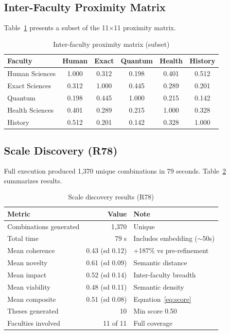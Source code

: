 \documentclass[a4paper,12pt]{article}
\begin{document}
\subsection{Inter-Faculty Proximity Matrix}

Table~\ref{tab:proximity} presents a subset of the 11$\times$11 proximity matrix.

\begin{table}[H]
\centering
\caption{Inter-faculty proximity matrix (subset)}
\label{tab:proximity}
\begin{tabular}{lccccc}
\toprule
\textbf{Faculty} & \textbf{Human} & \textbf{Exact} & \textbf{Quantum} & \textbf{Health} & \textbf{History} \\
\midrule
Human Sciences   & 1.000 & 0.312 & 0.198 & 0.401 & 0.512 \\
Exact Sciences   & 0.312 & 1.000 & 0.445 & 0.289 & 0.201 \\
Quantum          & 0.198 & 0.445 & 1.000 & 0.215 & 0.142 \\
Health Sciences  & 0.401 & 0.289 & 0.215 & 1.000 & 0.328 \\
History          & 0.512 & 0.201 & 0.142 & 0.328 & 1.000 \\
\bottomrule
\end{tabular}
\end{table}

\subsection{Scale Discovery (R78)}

Full execution produced 1,370 unique combinations in 79 seconds. Table~\ref{tab:r78} 
summarizes results.

\begin{table}[H]
\centering
\caption{Scale discovery results (R78)}
\label{tab:r78}
\begin{tabular}{lrl}
\toprule
\textbf{Metric} & \textbf{Value} & \textbf{Note} \\
\midrule
Combinations generated & 1,370 & Unique \\
Total time & 79 s & Includes embedding ($\sim$50s) \\
Mean coherence & 0.43 (sd 0.12) & +187\% vs pre-refinement \\
Mean novelty & 0.61 (sd 0.09) & Semantic distance \\
Mean impact & 0.52 (sd 0.14) & Inter-faculty breadth \\
Mean viability & 0.48 (sd 0.11) & Semantic density \\
Mean composite & 0.51 (sd 0.08) & Equation~\ref{eq:score} \\
Theses generated & 10 & Min score 0.50 \\
Faculties involved & 11 of 11 & Full coverage \\
\bottomrule
\end{tabular}
\end{table}
\end{document}
